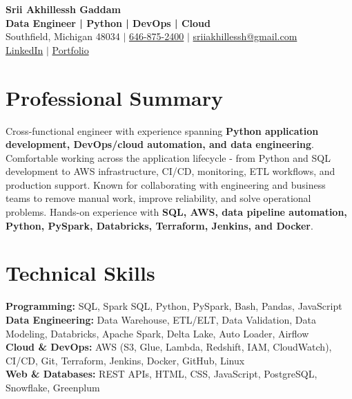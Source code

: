 \documentclass[letterpaper,10pt]{article}
\begin{document}
\fontsize{9.35pt}{10.45pt}\selectfont

\begin{center}
    {\LARGE \textbf{Srii Akhillessh Gaddam}} \\[-1pt]
    \textbf{Data Engineer | Python | DevOps | Cloud} \\[2pt]
    Southfield, Michigan 48034 $|$
    \href{tel:6468752400}{646-875-2400} $|$
    \href{mailto:sriiakhillessh@gmail.com}{sriiakhillessh@gmail.com} \\[1pt]
    \href{https://www.linkedin.com/in/srii-akhiilessh-gaddam-b48668191/}{LinkedIn} $|$
    \href{https://sriiakhillesshg.github.io/portfolio/}{Portfolio}
\end{center}
\vspace{-8pt}

\section{Professional Summary}
\small{Cross-functional engineer with experience spanning \textbf{Python application development, DevOps/cloud automation, and data engineering}. Comfortable working across the application lifecycle - from Python and SQL development to AWS infrastructure, CI/CD, monitoring, ETL workflows, and production support. Known for collaborating with engineering and business teams to remove manual work, improve reliability, and solve operational problems. Hands-on experience with \textbf{SQL, AWS, data pipeline automation, Python, PySpark, Databricks, Terraform, Jenkins, and Docker}.}

\section{Technical Skills}
\small{
\textbf{Programming:} SQL, Spark SQL, Python, PySpark, Bash, Pandas, JavaScript \\
\textbf{Data Engineering:} Data Warehouse, ETL/ELT, Data Validation, Data Modeling, Databricks, Apache Spark, Delta Lake, Auto Loader, Airflow \\
\textbf{Cloud \& DevOps:} AWS (S3, Glue, Lambda, Redshift, IAM, CloudWatch), CI/CD, Git, Terraform, Jenkins, Docker, GitHub, Linux \\
\textbf{Web \& Databases:} REST APIs, HTML, CSS, JavaScript, PostgreSQL, Snowflake, Greenplum
}
\end{document}
